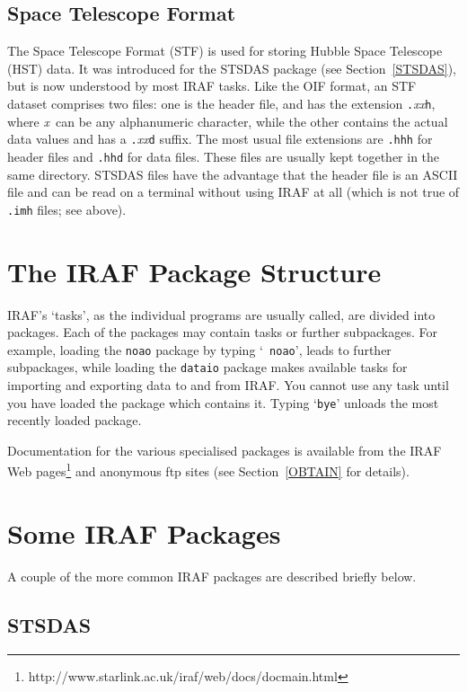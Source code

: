 \documentclass[twoside,11pt]{article}
\newcommand{\htmladdnormallinkfoot}[2]{#1\footnote{#2}}
\newcommand{\xlabel}[1]{}
\begin{document}
\subsection{Space Telescope Format}

The Space Telescope Format (STF) is used for storing Hubble Space
Telescope (HST) data.  It was introduced for the STSDAS package
(see Section~\ref{STSDAS}), but is now understood by most IRAF
tasks.  Like the OIF format, an STF dataset comprises two files:
one is the header file, and has the extension
{\tt .}{\it xx}\/{\tt h}, where {\it x}\, can be any
alphanumeric character, while the other contains the actual data
values and has a {\tt .}{\it xx}\/{\tt d} suffix.  The most usual file
extensions are {\tt .hhh} for header files and {\tt .hhd} for data files.
These files are usually kept together in the same directory.  STSDAS files
have the advantage that the header file is an ASCII file and can be read on
a terminal without using IRAF at all (which is not true of {\tt .imh} files;
see above).


\section{\xlabel{STRUCTURE}\label{STRUCTURE}The IRAF Package Structure}

IRAF's `tasks', as the individual programs are usually called, are
divided into packages.  Each of the packages may contain tasks or further
subpackages. For example, loading the {\tt noao} package by typing `{\tt
noao}', leads to further subpackages, while loading the {\tt dataio}
package makes available tasks for importing and exporting data to and
from IRAF. You cannot use any task until you have loaded the package
which contains it. Typing `{\tt bye}' unloads the most recently loaded
package.

Documentation for the various specialised packages is available from
the IRAF \htmladdnormallinkfoot{Web pages}
{http://www.starlink.ac.uk/iraf/web/docs/docmain.html}
and anonymous ftp sites (see Section~\ref{OBTAIN} for details).


\section{\xlabel{PACKAGES}\label{PACKAGES}Some IRAF Packages}

A couple of the more common IRAF packages are described briefly
below.

\subsection{\label{STSDAS}STSDAS}
\end{document}
